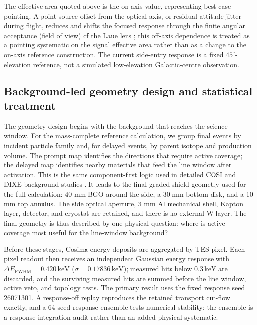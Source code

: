 \documentclass[11pt]{article}
\newcommand{\keV}{\ensuremath{\,\mathrm{keV}}}
\begin{document}
The effective area quoted above is the on-axis value, representing best-case
pointing. A point source offset from the optical axis, or residual attitude
jitter during flight, reduces and shifts the focused response through the finite
angular acceptance (field of view) of the Laue lens
\cite{Barriere2009Laue,Weidenspointner2006MAX}; this off-axis dependence is
treated as a pointing systematic on the signal effective area rather than as a
change to the on-axis reference construction. The current side-entry response
is a fixed $45^\circ$-elevation reference, not a simulated
low-elevation Galactic-centre observation.

\subsection{Background-led geometry design and statistical treatment}
\label{subsec:comparison_hierarchy}

The geometry design begins with the background that reaches the science window.
For the mass-complete reference calculation, we group final events by incident
particle family and, for delayed events, by parent isotope and production volume.
The prompt map identifies the directions that require active coverage; the delayed
map identifies nearby materials that feed the line window after activation. This is
the same component-first logic used in detailed COSI and DIXE background studies
\cite{Gallego2025Balloon,Tian2026DIXE}. It leads to the final graded-shield geometry used for
the full calculation: 40 mm BGO around the side, a 30 mm bottom disk, and a 10 mm
top annulus. The side optical aperture, 3 mm Al mechanical shell, Kapton layer,
detector, and cryostat are retained, and there is no external W layer. The final
geometry is thus described by one physical question: where is active coverage most
useful for the line-window background?

Before these stages, Cosima energy deposits are aggregated by TES pixel. Each
pixel readout then receives an independent Gaussian energy response with
$\Delta E_{\mathrm{FWHM}}=0.420\keV$ ($\sigma=0.17836\keV$); measured hits below
$0.3\keV$ are discarded, and the surviving measured hits are summed before the
line window, active veto, and topology tests. The primary result uses the fixed
response seed 26071301. A response-off replay reproduces the retained transport
cut-flow exactly, and a 64-seed response ensemble tests numerical stability; the
ensemble is a response-integration audit rather than an added physical systematic.
\end{document}
